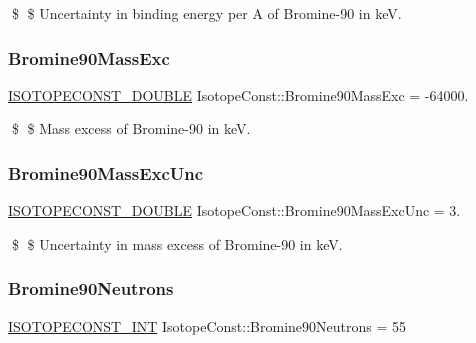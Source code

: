 \$ \$ Uncertainty in binding energy per A of Bromine-\/90 in keV. \mbox{\label{group___isotope_const-_bromine-_br90_ga74c00951bfdd933816b6e762f0747e6f}} 
\subsubsection{\texorpdfstring{Bromine90\+Mass\+Exc}{Bromine90MassExc}}
{\footnotesize\ttfamily \mbox{\hyperlink{group___isotope_const-_macros_ga8f45a7272ce02c0b4c65c44636ed719a}{I\+S\+O\+T\+O\+P\+E\+C\+O\+N\+S\+T\+\_\+\+D\+O\+U\+B\+LE}} Isotope\+Const\+::\+Bromine90\+Mass\+Exc = -\/64000.}

\$ \$ Mass excess of Bromine-\/90 in keV. \mbox{\label{group___isotope_const-_bromine-_br90_gac920df207657bfe062298bd902cf3654}} 
\subsubsection{\texorpdfstring{Bromine90\+Mass\+Exc\+Unc}{Bromine90MassExcUnc}}
{\footnotesize\ttfamily \mbox{\hyperlink{group___isotope_const-_macros_ga8f45a7272ce02c0b4c65c44636ed719a}{I\+S\+O\+T\+O\+P\+E\+C\+O\+N\+S\+T\+\_\+\+D\+O\+U\+B\+LE}} Isotope\+Const\+::\+Bromine90\+Mass\+Exc\+Unc = 3.}

\$ \$ Uncertainty in mass excess of Bromine-\/90 in keV. \mbox{\label{group___isotope_const-_bromine-_br90_ga5fc43f81eb37d56aa52497d9c36a88bb}} 
\subsubsection{\texorpdfstring{Bromine90\+Neutrons}{Bromine90Neutrons}}
{\footnotesize\ttfamily \mbox{\hyperlink{group___isotope_const-_macros_ga5f18360b3e99483a35c32d789e62621c}{I\+S\+O\+T\+O\+P\+E\+C\+O\+N\+S\+T\+\_\+\+I\+NT}} Isotope\+Const\+::\+Bromine90\+Neutrons = 55}

